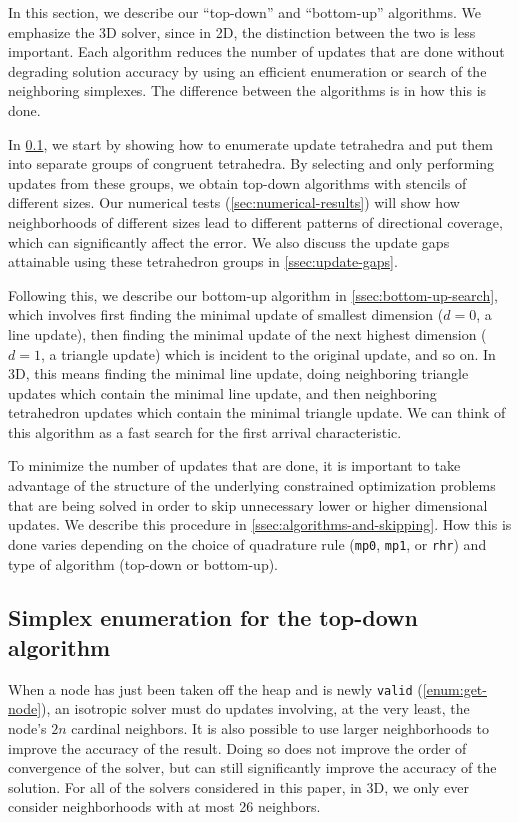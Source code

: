 \documentclass[eikonal.tex]{subfiles}
\begin{document}
In this section, we describe our ``top-down'' and ``bottom-up''
algorithms. We emphasize the 3D solver, since in 2D, the distinction
between the two is less important. Each algorithm reduces the number
of updates that are done without degrading solution accuracy by using
an efficient enumeration or search of the neighboring simplexes. The
difference between the algorithms is in how this is done.

In \cref{ssec:simplex-enumeration}, we start by showing how to
enumerate update tetrahedra and put them into separate groups of
congruent tetrahedra. By selecting and only performing updates from
these groups, we obtain top-down algorithms with stencils of different
sizes. Our numerical tests (\cref{sec:numerical-results}) will show
how neighborhoods of different sizes lead to different patterns of
directional coverage, which can significantly affect the error. We
also discuss the update gaps attainable using these tetrahedron groups
in \cref{ssec:update-gaps}.

Following this, we describe our bottom-up algorithm in
\cref{ssec:bottom-up-search}, which involves first finding the minimal
update of smallest dimension ($d = 0$, a line update), then finding
the minimal update of the next highest dimension ($d = 1$, a triangle
update) which is incident to the original update, and so on. In 3D,
this means finding the minimal line update, doing neighboring triangle
updates which contain the minimal line update, and then neighboring
tetrahedron updates which contain the minimal triangle update. We can
think of this algorithm as a fast search for the first arrival
characteristic.

To minimize the number of updates that are done, it is important to
take advantage of the structure of the underlying constrained
optimization problems that are being solved in order to skip
unnecessary lower or higher dimensional updates. We describe this
procedure in \cref{ssec:algorithms-and-skipping}. How this is done
varies depending on the choice of quadrature rule (\texttt{mp0},
\texttt{mp1}, or \texttt{rhr}) and type of algorithm (top-down or
bottom-up).

\subsection{Simplex enumeration for the top-down
  algorithm}\label{ssec:simplex-enumeration}

When a node has just been taken off the heap and is newly
\texttt{valid} (\cref{enum:get-node}), an isotropic solver must do
updates involving, at the very least, the node's $2n$ cardinal
neighbors. It is also possible to use larger neighborhoods to improve
the accuracy of the result. Doing so does not improve the order of
convergence of the solver, but can still significantly improve the
accuracy of the solution. For all of the solvers considered in this
paper, in 3D, we only ever consider neighborhoods with at most 26
neighbors.
\end{document}
